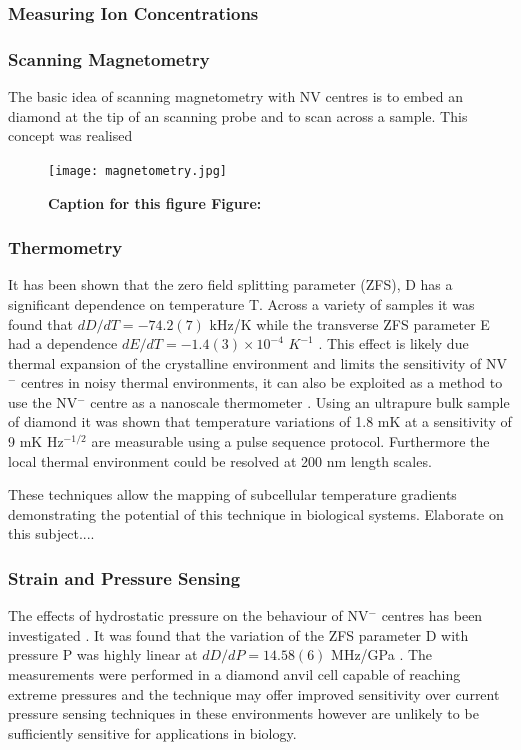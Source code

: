 \documentclass[10pt]{article}
\begin{document}
\begin{multicols}{2}
\subsubsection{Measuring Ion Concentrations}

\subsubsection{Scanning Magnetometry}
The basic idea of scanning magnetometry with NV centres is to embed an diamond at the tip of an scanning probe and to scan across a sample. This concept was realised \cite{balasubramanian2008nanoscale}


\begin{figure}[h]
  \texttt{[image: magnetometry.jpg]}
	  \caption{\textbf{Caption for this figure Figure:\cite{balasubramanian2008nanoscale}}}
  \label{fig:energy_level}
\end{figure}



\subsubsection{Thermometry} 
It has been shown \cite{acosta2010temperature} that the zero field splitting parameter (ZFS), D has a significant dependence on temperature T. Across a variety of samples it was found that $dD/dT = -74.2(7)$ kHz/K while the transverse ZFS parameter E had a dependence $dE/dT = -1.4(3)\times10^{-4}$ $K^{-1}$ \cite{acosta2010temperature}. This effect is likely due thermal expansion of the crystalline environment and limits the sensitivity of NV$^-$ centres in noisy thermal environments, it can also be exploited as a method to use the NV$^-$ centre as a nanoscale thermometer \cite{toyli2013fluorescence,neumann2013high,kucsko2013nanometre}. Using an ultrapure bulk sample of diamond it was shown \cite{kucsko2013nanometre} that temperature variations of 1.8 mK at a sensitivity of 9 mK Hz$^{-1/2}$ are measurable using a pulse sequence protocol. Furthermore the local thermal environment could be resolved at 200 nm length scales.

These techniques allow the mapping of subcellular temperature gradients \cite{kucsko2013nanometre} demonstrating the potential of this technique in biological systems. Elaborate on this subject....

\subsubsection{Strain and Pressure Sensing}
The effects of hydrostatic pressure on the behaviour of NV$^-$ centres has been investigated \cite{doherty2014electronic}. It was found that the variation of the ZFS parameter D with pressure P was highly linear at $dD/dP = 14.58(6)$ MHz/GPa \cite{doherty2014electronic}. The measurements were performed in a diamond anvil cell capable of reaching extreme pressures and the technique may offer improved sensitivity over current pressure sensing techniques in these environments \cite{doherty2014electronic} however are unlikely to be sufficiently sensitive for applications in biology. 


\end{multicols}
\end{document}
